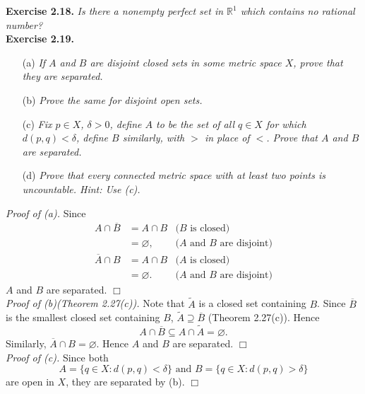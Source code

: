 \documentclass{article}
\begin{document}



\textbf{Exercise 2.18.}
\emph{Is there a nonempty perfect set in $\mathbb{R}^1$ which contains no rational number?} \\






\textbf{Exercise 2.19.}
\begin{enumerate}
\item[(a)]
\emph{If $A$ and $B$ are disjoint closed sets in some metric space $X$,
prove that they are separated.}
\item[(b)]
\emph{Prove the same for disjoint open sets.}
\item[(c)]
\emph{Fix $p \in X$, $\delta > 0$,
define $A$ to be the set of all $q \in X$ for which $d(p,q) < \delta$,
define $B$ similarly, with $>$ in place of $<$.
Prove that $A$ and $B$ are separated.}
\item[(d)]
\emph{Prove that every connected metric space with at least two points
is uncountable.  Hint: Use (c).} \\
\end{enumerate}

\emph{Proof of (a).}
Since
\begin{align*}
A \cap \overline{B}
&= A \cap B
  &\text{($B$ is closed)} \\
&= \varnothing,
  &\text{($A$ and $B$ are disjoint)} \\
\overline{A} \cap B
&= A \cap B
  &\text{($A$ is closed)} \\
&= \varnothing.
  &\text{($A$ and $B$ are disjoint)}
\end{align*}
$A$ and $B$ are separated.
$\Box$ \\

\emph{Proof of (b)(Theorem 2.27(c)).}
Note that $\widetilde{A}$ is a closed set containing $B$.
Since $\overline{B}$ is the smallest closed set containing $B$,
$\widetilde{A} \supseteq \overline{B}$ (Theorem 2.27(c)).
Hence $$A \cap \overline{B} \subseteq A \cap \widetilde{A} = \varnothing.$$
Similarly, $\overline{A} \cap B = \varnothing$.
Hence $A$ and $B$ are separated.
$\Box$ \\

\emph{Proof of (c).}
Since both
$$A = \{ q \in X : d(p,q) < \delta \} \text{ and } B = \{ q \in X : d(p,q) > \delta \}$$
are open in $X$, they are separated by (b).
$\Box$ \\
\end{document}
